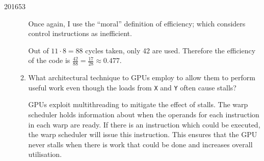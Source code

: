 \documentclass[10pt,\jkfside,a4paper]{article}
\begin{document}
\begin{examquestion}{2016}{5}{3}
\begin{enumerate}[label=(\alph*)]
\begin{enumerate}[label=(\roman*)]
Once again, I use the ``moral'' definition of efficiency; which considers
control instructions as inefficient.

Out of $11 \cdot 8 = 88$ cycles taken, only 42 are used. Therefore the
efficiency of the code is $\frac{42}{88} = \frac{17}{28} \approx 0.477$.

\item What architectural technique to GPUs employ to allow them to perform
useful work even though the loads from \texttt{X} and \texttt{Y} often cause
stalls?

GPUs exploit multithreading to mitigate the effect of stalls. The warp
scheduler holds information about when the operands for each instruction in
each warp are ready. If there is an instruction which could be executed, the
warp scheduler will issue this instruction. This ensures that the GPU never
stalls when there is work that could be done and increases overall utilisation.

\end{enumerate}

\end{enumerate}

\end{examquestion}
\end{document}
